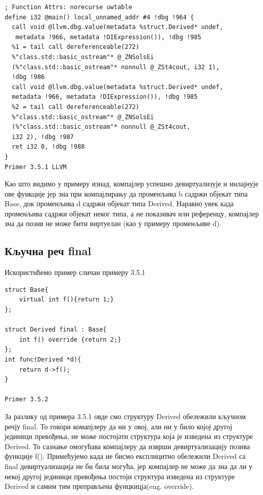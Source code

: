 \documentclass[12pt,oneside]{memoir}
\begin{document}
 \begin{lstlisting}
; Function Attrs: norecurse uwtable
define i32 @main() local_unnamed_addr #4 !dbg !964 {
  call void @llvm.dbg.value(metadata %struct.Derived* undef,
   metadata !966, metadata !DIExpression()), !dbg !985
  %1 = tail call dereferenceable(272) 
  %"class.std::basic_ostream"* @_ZNSolsEi
  (%"class.std::basic_ostream"* nonnull @_ZSt4cout, i32 1), 
  !dbg !986
  call void @llvm.dbg.value(metadata %struct.Derived* undef, 
  metadata !966, metadata !DIExpression()), !dbg !985
  %2 = tail call dereferenceable(272) 
  %"class.std::basic_ostream"* @_ZNSolsEi
  (%"class.std::basic_ostream"* nonnull @_ZSt4cout, 
  i32 2), !dbg !987
  ret i32 0, !dbg !988
}
Primer 3.5.1 LLVM
 \end{lstlisting}
 
 Као што видимо у примеру изнад, компајлер успешно девиртуализује и инлајнује ове функције
 јер зна при компајлирању да променљива b садржи објекат типа Base, док променљива
 d садржи објекат типа Derived.
 Наравно увек када променљива садржи објекат неког типа, а не показивач или референцу, компајлер зна да позив не може бити виртуелан (као у примеру променљиве d).
 
 \subsection{Кључна реч final}
 
 Искористићемо пример сличан примеру 3.5.1
 
\begin{lstlisting}
struct Base{
    virtual int f(){return 1;}
};

struct Derived final : Base{
    int f() override {return 2;}
};
int func(Derived *d){
    return d->f();
}

Primer 3.5.2
\end{lstlisting}
 
 За разлику од примера 3.5.1 овде смо структуру Derived обележили кључном 
 речју final.
 То говори комапјлеру да ни у овој, али ни у било којој другој јединици превођења, 
 не може постојати структура која је изведена из структуре Derived.
 То сазнање омогућава компајлеру да изврши девиртуализацију позива функције f().
 Примећујемо када не бисмо експлицитно обележили  Derived са final девиртуализација
 не би била могућа, јер компајлер не може да зна да ли у некој другој јединици превођења
 постоји структура изведена из структуре Derived и самим тим преправљена фунцкицја(eng. override).
 
\end{document}
